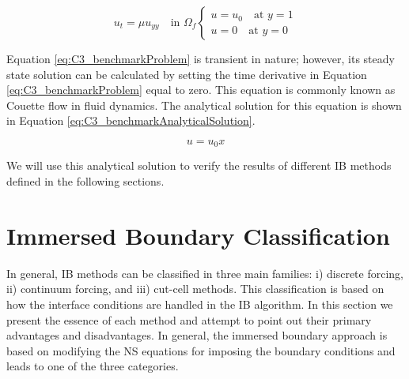 \begin{subequations}\label{eq:C3_benchmarkProblem}
\begin{equation}
    u_t = \mu u_{yy} \quad \text{in } \Omega_f
\end{equation}
\begin{equation}
\begin{cases}
    u = u_0 \quad \text{at } y = 1 \\
    u = 0 \quad \text{at } y = 0
\end{cases}
\end{equation}
\end{subequations}

Equation \eqref{eq:C3_benchmarkProblem} is transient in nature; however, its steady state solution can be calculated by setting the time derivative in Equation \eqref{eq:C3_benchmarkProblem} equal to zero. This equation is commonly known as Couette flow in fluid dynamics. The analytical solution for this equation is shown in Equation \eqref{eq:C3_benchmarkAnalyticalSolution}.

\begin{equation}\label{eq:C3_benchmarkAnalyticalSolution}
    u = u_0 x
\end{equation}

We will use this analytical solution to verify the results of different IB methods defined in the following sections.

\section{Immersed Boundary Classification}
In general, IB methods can be classified in three main families: i) discrete forcing, ii) continuum forcing, and iii) cut-cell methods. This classification is based on how the interface conditions are handled in the IB algorithm. In this section we present the essence of each method and attempt to point out their primary advantages and disadvantages. In general, the immersed boundary approach is based on modifying the NS equations for imposing the boundary conditions and leads to one of the three categories.





